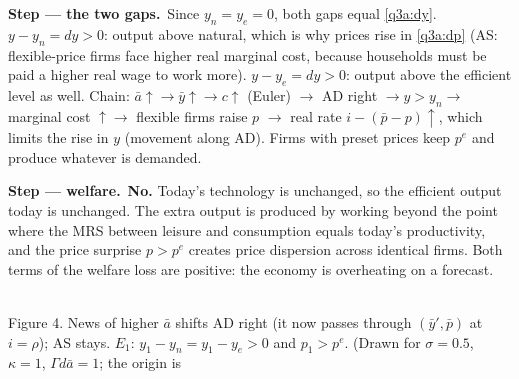 \documentclass[11pt,a4paper]{article}
\newcommand{\passo}[2]{\par\smallskip\noindent\textbf{Step --- #1.}~#2}
\begin{document}
\begin{sol}
\passo{the two gaps}{Since $y_n=y_e=0$, both gaps equal \eqref{q3a:dy}. $y-y_n=dy>0$: output above
natural, which is why prices rise in \eqref{q3a:dp} (AS: flexible-price firms face higher real
marginal cost, because households must be paid a higher real wage to work more). $y-y_e=dy>0$:
output above the efficient level as well.
Chain: $\bar a\uparrow\to\bar y\uparrow\to c\uparrow$ (Euler) $\to$ AD right $\to y>y_n\to$ marginal cost $\uparrow\to$
flexible firms raise $p$ $\to$ real rate $i-(\bar p-p)\uparrow$, which limits the rise in $y$ (movement along AD).
Firms with preset prices keep $p^e$ and produce whatever is demanded.}
\passo{welfare}{\textbf{No.} Today's technology is unchanged, so the efficient output today is unchanged.
The extra output is produced by working beyond the point where the MRS between leisure and consumption equals
today's productivity, and the price surprise $p>p^e$ creates price dispersion across identical firms. Both
terms of the welfare loss are positive: the economy is overheating on a forecast.}
\begin{center}
\\
{\footnotesize Figure 4. News of higher $\bar a$ shifts AD right (it now passes through $(\bar y',\bar p)$ at $i=\rho$);
AS stays. $E_1$: $y_1-y_n=y_1-y_e>0$ and $p_1>p^e$. (Drawn for $\sigma=0.5$, $\kappa=1$, $\Gamma d\bar a=1$; the origin is
}
\end{center}
\end{sol}
\end{document}
